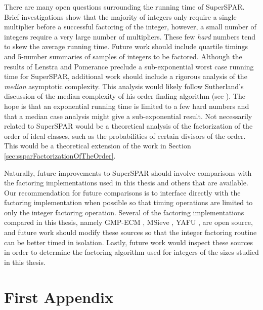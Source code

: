 \documentclass{ucalgthes1}
\theoremstyle{definition}
\begin{document}
There are many open questions surrounding the running time of SuperSPAR.  Brief investigations show that the majority of integers only require a single multiplier before a successful factoring of the integer, however, a small number of integers require a very large number of multipliers.  These few \emph{hard} numbers tend to skew the average running time.  Future work should include quartile timings and 5-number summaries of samples of integers to be factored.  Although the results of Lenstra and Pomerance \cite[\S 11]{Lenstra1992} preclude a sub-exponential worst case running time for SuperSPAR, additional work should include a rigorous analysis of the \emph{median} asymptotic complexity.  This analysis would likely follow Sutherland's discussion of the median complexity of his order finding algorithm (see \cite[\S 5.4]{Sutherland2007}).  The hope is that an exponential running time is limited to a few hard numbers and that a median case analysis might give a sub-exponential result.  Not necessarily related to SuperSPAR would be a theoretical analysis of the factorization of the order of ideal classes, such as the probabilities of certain divisors of the order.  This would be a theoretical extension of the work in Section \ref{sec:ssparFactorizationOfTheOrder}.

Naturally, future improvements to SuperSPAR should involve comparisons with the factoring implementations used in this thesis and others that are available.  Our recommendation for future comparisons is to interface directly with the factoring implementation when possible so that timing operations are limited to only the integer factoring operation.  Several of the factoring implementations compared in this thesis, namely GMP-ECM \cite{Ecm}, MSieve \cite{Msieve}, YAFU \cite{Yafu}, are open source, and future work should modify these sources so that the integer factoring routine can be better timed in isolation.  Lastly, future work would inspect these sources in order to determine the factoring algorithm used for integers of the sizes studied in this thesis.


\appendix
\chapter{First Appendix}
\label{chap:appendix}
\end{document}
